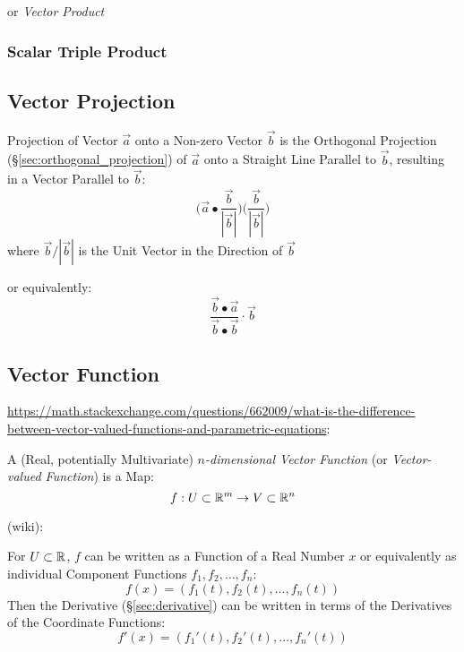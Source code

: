 or \emph{Vector Product}



\subsubsection{Scalar Triple Product}\label{sec:scalar_triple_product}



\subsection{Vector Projection}\label{sec:vector_projection}

Projection of Vector $\vec{a}$ onto a Non-zero Vector $\vec{b}$ is the
Orthogonal Projection (\S\ref{sec:orthogonal_projection}) of $\vec{a}$ onto a
Straight Line Parallel to $\vec{b}$, resulting in a Vector Parallel to
$\vec{b}$:
\[
  \big(\vec{a} \bullet \frac{\vec{b}}{|\vec{b}|}\big)
  \big(\frac{\vec{b}}{|\vec{b}|}\big)
\]
where $\vec{b}/|\vec{b}|$ is the Unit Vector in the Direction of $\vec{b}$

or equivalently:
\[
\frac{\vec{b} \bullet \vec{a}}
  {\vec{b} \bullet \vec{b}} \cdot \vec{b}
\]



\subsection{Vector Function}\label{sec:vector_function}

\url{https://math.stackexchange.com/questions/662009/what-is-the-difference-between-vector-valued-functions-and-parametric-equations}:

A (Real, potentially Multivariate) \emph{$n$-dimensional Vector Function} (or
\emph{Vector-valued Function}) is a Map:
\[
  f : U \subset \mathbb{R}^m \rightarrow V \subset \mathbb{R}^n
\]

(wiki):

For $U \subset \mathbb{R}$, $f$ can be written as a Function of a Real Number $x$ or
equivalently as individual Component Functions $f_1, f_2, \ldots, f_n$:
\[
  f(x) = (f_1(t), f_2(t), \ldots, f_n(t))
\]
Then the Derivative (\S\ref{sec:derivative}) can be written in terms of the
Derivatives of the Coordinate Functions:
\[
  f'(x) = (f_1'(t), f_2'(t), \ldots, f_n'(t))
\]

